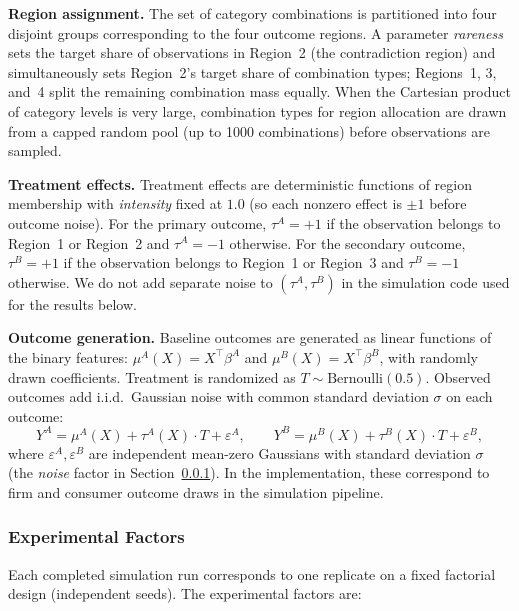 \documentclass[11pt,letterpaper,english]{article}
\theoremstyle{definition}
\theoremstyle{definition}
\begin{document}
\begin{bibunit}
\vspace{6pt}
\noindent
\textbf{Region assignment.}
The set of category combinations is partitioned into four disjoint groups corresponding to the four outcome regions. A parameter \emph{rareness} sets the target share of observations in Region~2 (the contradiction region) and simultaneously sets Region~2's target share of combination types; Regions~1, 3, and~4 split the remaining combination mass equally. When the Cartesian product of category levels is very large, combination types for region allocation are drawn from a capped random pool (up to 1000 combinations) before observations are sampled.

\vspace{6pt}
\noindent
\textbf{Treatment effects.}
Treatment effects are deterministic functions of region membership with \emph{intensity} fixed at $1.0$ (so each nonzero effect is $\pm 1$ before outcome noise). For the primary outcome, $\tau^A = +1$ if the observation belongs to Region~1 or Region~2 and $\tau^A = -1$ otherwise. For the secondary outcome, $\tau^B = +1$ if the observation belongs to Region~1 or Region~3 and $\tau^B = -1$ otherwise. We do not add separate noise to $(\tau^A,\tau^B)$ in the simulation code used for the results below.

\vspace{6pt}
\noindent
\textbf{Outcome generation.}
Baseline outcomes are generated as linear functions of the binary features: $\mu^A(X) = X^\top \beta^A$ and $\mu^B(X) = X^\top \beta^B$, with randomly drawn coefficients. Treatment is randomized as $T \sim \text{Bernoulli}(0.5)$. Observed outcomes add i.i.d.\ Gaussian noise with common standard deviation $\sigma$ on each outcome:
\[
Y^A = \mu^A(X) + \tau^A(X) \cdot T + \varepsilon^A, \qquad
Y^B = \mu^B(X) + \tau^B(X) \cdot T + \varepsilon^B,
\]
where $\varepsilon^A,\varepsilon^B$ are independent mean-zero Gaussians with standard deviation $\sigma$ (the \emph{noise} factor in Section~\ref{sec:factors}). In the implementation, these correspond to firm and consumer outcome draws in the simulation pipeline.

\subsubsection{Experimental Factors}
\label{sec:factors}

Each completed simulation run corresponds to one replicate on a fixed factorial design (independent seeds). The experimental factors are:


\end{bibunit}
\end{document}
